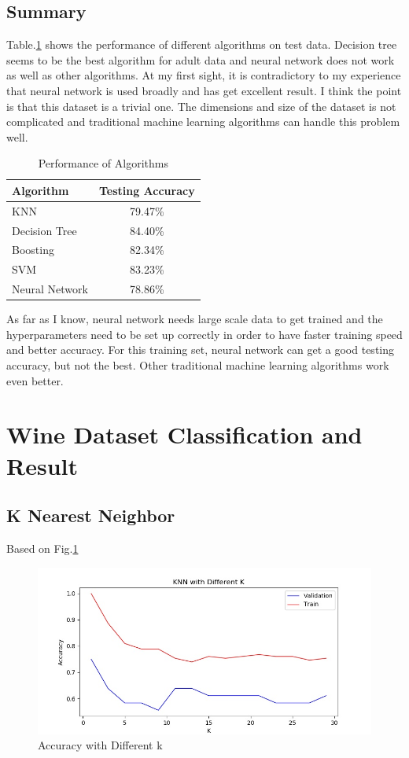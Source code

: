 \documentclass[11pt]{article}
\begin{document}
\subsection{Summary}
Table.\ref{tab:adult} shows the performance of different algorithms on test data. Decision tree seems to be the best algorithm for adult data and neural network does not work as well as other algorithms. At my first sight, it is contradictory to my experience that neural network is used broadly and has get excellent result. I think the point is that this dataset is a trivial one. The dimensions and size of the dataset is not complicated and traditional machine learning algorithms can handle this problem well.
\begin{table}[h!]
  \begin{center}
    \caption{Performance of Algorithms}
    \label{tab:adult}
    \begin{tabular}{l|c}
      \textbf{Algorithm} & \textbf{Testing Accuracy}\\
      \hline
      KNN & 79.47\%\\
      Decision Tree & 84.40\%\\
      Boosting & 82.34\%\\
      SVM & 83.23\% \\
      Neural Network & 78.86\%\\
    \end{tabular}
  \end{center}
\end{table}
As far as I know, neural network needs large scale data to get trained and the hyperparameters need to be set up correctly in order to have faster training speed and better accuracy. For this training set, neural network can get a good testing accuracy, but not the best. Other traditional machine learning algorithms work even better.  
\section{Wine Dataset Classification and Result}
\subsection{K Nearest Neighbor}
Based on Fig.\ref{fig:wine_knn}
\begin{figure}[h!]
  \includegraphics[width=\linewidth]{./wine/knn_k.jpg}
  \caption{Accuracy with Different k}
  \label{fig:wine_knn}
\end{figure}
\end{document}
